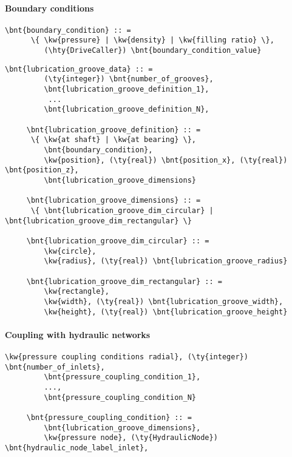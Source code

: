 \paragraph{Boundary conditions}
\begin{Verbatim}[commandchars=\\\{\}]
     \bnt{boundary_condition} :: =
      \{ \kw{pressure} | \kw{density} | \kw{filling ratio} \},
         (\hty{DriveCaller}) \bnt{boundary_condition_value}
\end{Verbatim}
\begin{Verbatim}[commandchars=\\\{\}]
     \bnt{lubrication_groove_data} :: =
         (\ty{integer}) \bnt{number_of_grooves},
         \bnt{lubrication_groove_definition_1},
          ...
         \bnt{lubrication_groove_definition_N},

     \bnt{lubrication_groove_definition} :: =
      \{ \kw{at shaft} | \kw{at bearing} \},
         \bnt{boundary_condition},
         \kw{position}, (\ty{real}) \bnt{position_x}, (\ty{real}) \bnt{position_z},
         \bnt{lubrication_groove_dimensions}

     \bnt{lubrication_groove_dimensions} :: =
      \{ \bnt{lubrication_groove_dim_circular} | \bnt{lubrication_groove_dim_rectangular} \}

     \bnt{lubrication_groove_dim_circular} :: =
         \kw{circle},
         \kw{radius}, (\ty{real}) \bnt{lubrication_groove_radius}

     \bnt{lubrication_groove_dim_rectangular} :: =
         \kw{rectangle},
         \kw{width}, (\ty{real}) \bnt{lubrication_groove_width},
         \kw{height}, (\ty{real}) \bnt{lubrication_groove_height}

\end{Verbatim}
\paragraph{Coupling with hydraulic networks}
\begin{Verbatim}[commandchars=\\\{\}]
     \kw{pressure coupling conditions radial}, (\ty{integer}) \bnt{number_of_inlets},
         \bnt{pressure_coupling_condition_1},
         ...,
         \bnt{pressure_coupling_condition_N}

     \bnt{pressure_coupling_condition} :: =
         \bnt{lubrication_groove_dimensions},
         \kw{pressure node}, (\ty{HydraulicNode}) \bnt{hydraulic_node_label_inlet},
\end{Verbatim}
